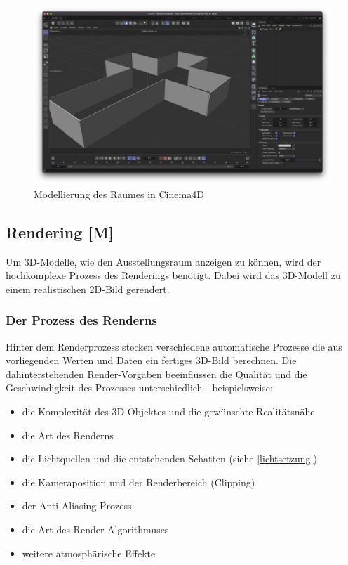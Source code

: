 \begin{figure} [h t]
    \centering
    \includegraphics[scale=0.2]{pics/Room-model.png}
    \caption{Modellierung des Raumes in Cinema4D}
    \label{fig:tech:front:room-model}
  \end{figure}

\subsection{Rendering [M]} 
Um 3D-Modelle, wie den Ausstellungsraum anzeigen zu können, wird der hochkomplexe Prozess des Renderings benötigt. Dabei wird das 3D-Modell zu einem realistischen 2D-Bild gerendert. 
\cite{AdobeRendering} \cite{Rendering3DModels}

\subsubsection{Der Prozess des Renderns}
Hinter dem Renderprozess stecken verschiedene automatische Prozesse die aus vorliegenden Werten und Daten ein fertiges 3D-Bild berechnen. Die dahinterstehenden Render-Vorgaben beeinflussen die Qualität und die Geschwindigkeit des Prozesses unterschiedlich - beispielsweise:

\begin{itemize}
    \item die Komplexität des 3D-Objektes und die gewünschte Realitätsnähe
    \item die Art des Renderns
    \item die Lichtquellen und die entstehenden Schatten (siehe \ref{lichtsetzung})
    \item die Kameraposition und der Renderbereich (Clipping)
    \item der Anti-Aliasing Prozess
    \item die Art des Render-Algorithmuses
    \item weitere atmosphärische Effekte 
    
    
\end{itemize}
\cite{Rendering3DModels}

